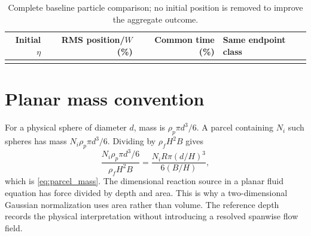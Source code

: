 \begin{table}[htbp]\centering\small
\caption{Complete baseline particle comparison; no initial position is
removed to improve the aggregate outcome.}\label{tab:path_limits}
\begin{tabularx}{\textwidth}{@{}rrrY@{}}\toprule
Initial $\eta$ & RMS position/$W$ (\%) & Common time (\%) & Same endpoint class\\\midrule
{}
\bottomrule\end{tabularx}
\end{table}

\section{Planar mass convention}
For a physical sphere of diameter $d$, mass is $\rho_p\pi d^3/6$.
A parcel containing $N_i$ such spheres has mass
$N_i\rho_p\pi d^3/6$. Dividing by $\rho_fH^2B$ gives
\begin{equation}
 \frac{N_i\rho_p\pi d^3/6}{\rho_fH^2B}
 =\frac{N_iR\pi(d/H)^3}{6(B/H)},
\end{equation}
which is \cref{eq:parcel_mass}. The dimensional reaction source in a planar
fluid equation has force divided by depth and area. This is why a
two-dimensional Gaussian normalization uses area rather than volume. The
reference depth records the physical interpretation without introducing a
resolved spanwise flow field.
